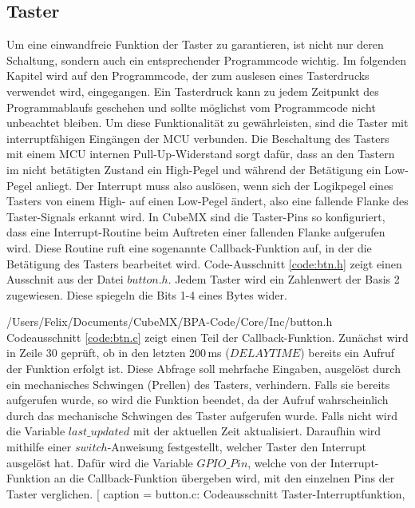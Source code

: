 
\subsection{Taster}
Um eine einwandfreie Funktion der Taster zu garantieren, ist nicht nur deren Schaltung, sondern auch ein entsprechender Programmcode wichtig. Im folgenden Kapitel wird auf den Programmcode, der zum auslesen eines Tasterdrucks verwendet wird, eingegangen. Ein Tasterdruck kann zu jedem Zeitpunkt des Programmablaufs geschehen und sollte möglichst vom Programmcode nicht unbeachtet bleiben. Um diese Funktionalität zu gewährleisten, sind die Taster mit interruptfähigen Eingängen der MCU verbunden. Die Beschaltung des Tasters mit einem MCU internen Pull-Up-Widerstand sorgt dafür, dass an den Tastern im nicht betätigten Zustand ein High-Pegel und während der Betätigung ein Low-Pegel anliegt. Der Interrupt muss also auslösen, wenn sich der Logikpegel eines Tasters von einem High- auf einen Low-Pegel ändert, also eine fallende Flanke des Taster-Signals erkannt wird. In CubeMX sind die Taster-Pins so konfiguriert, dass eine Interrupt-Routine beim Auftreten einer fallenden Flanke aufgerufen wird. Diese Routine ruft eine sogenannte Callback-Funktion auf, in der die Betätigung des Tasters bearbeitet wird. Code-Ausschnitt \ref{code:btn.h} zeigt einen Ausschnit aus der Datei $button.h$. Jedem Taster wird ein Zahlenwert der Basis 2 zugewiesen. Diese spiegeln die Bits 1-4 eines Bytes wider.

{/Users/Felix/Documents/CubeMX/BPA-Code/Core/Inc/button.h} 
Codeausschnitt \ref{code:btn.c} zeigt einen Teil der Callback-Funktion. Zunächst wird in Zeile 30 geprüft, ob in den letzten 200\,ms ($DELAYTIME$) bereits ein Aufruf der Funktion erfolgt ist. Diese Abfrage soll mehrfache Eingaben, ausgelöst durch ein mechanisches Schwingen (Prellen) des Tasters, verhindern. Falls sie bereits aufgerufen wurde, so wird die Funktion beendet, da der Aufruf wahrscheinlich durch das mechanische Schwingen des Taster aufgerufen wurde. Falls nicht wird die Variable $last\_updated$ mit der aktuellen Zeit aktualisiert. Daraufhin wird mithilfe einer $switch$-Anweisung festgestellt, welcher Taster den Interrupt ausgelöst hat. Dafür wird die Variable $GPIO\_Pin$, welche von der Interrupt-Funktion an die Callback-Funktion übergeben wird, mit den einzelnen Pins der Taster verglichen. 
[
caption = button.c: Codeausschnitt Taster-Interruptfunktion,
